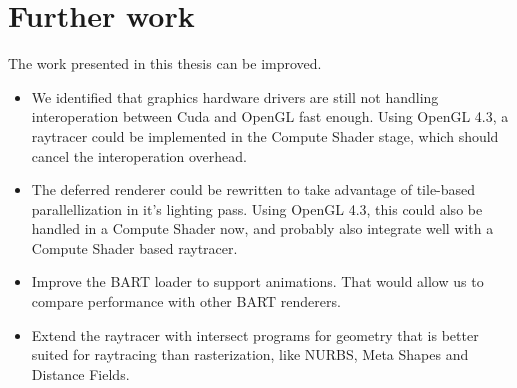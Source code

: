 \section{Further work}

The work presented in this thesis can be improved. 
\begin{itemize}
	\item We identified that graphics hardware drivers are still not handling interoperation between Cuda and OpenGL fast enough. Using OpenGL 4.3, a raytracer could be implemented in the Compute Shader stage, which should cancel the interoperation overhead.
	\item The deferred renderer could be rewritten to take advantage of tile-based parallellization in it's lighting pass. Using OpenGL 4.3, this could also be handled in a Compute Shader now, and probably also integrate well with a Compute Shader based raytracer.
	\item Improve the BART loader to support animations. That would allow us to compare performance with other BART renderers.
	\item Extend the raytracer with intersect programs for geometry that is better suited for raytracing than rasterization, like NURBS, Meta Shapes and Distance Fields.
\end{itemize}